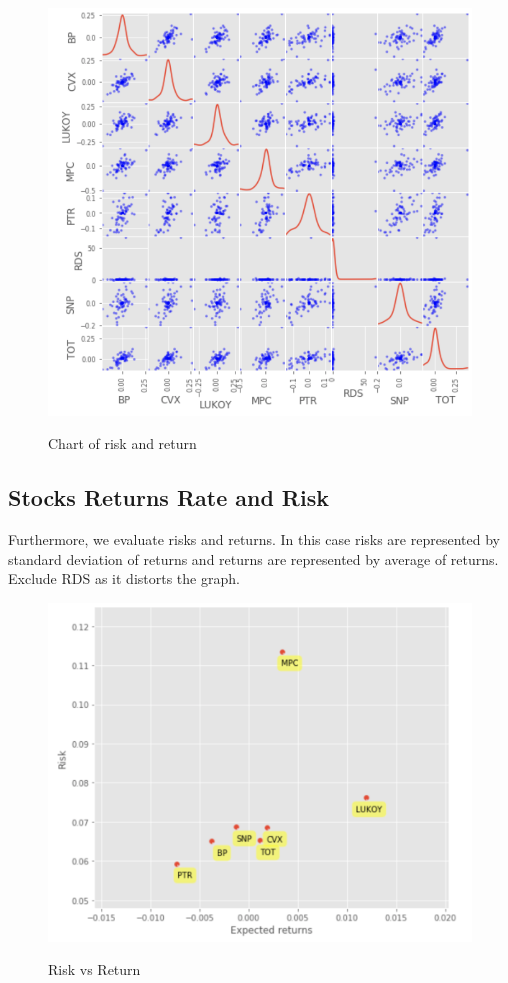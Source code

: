 \documentclass [a4paper, 11pt] {article}
\begin{document}
\begin{figure}[h]
\caption{Chart of risk and return}
\begin{center}
\includegraphics[scale=0.55]{matrix}
\label{fig:scat2}
\end{center}
\end{figure}
\clearpage

\subsection {Stocks Returns Rate and Risk}
Furthermore, we evaluate  risks and returns. In this case risks are represented by standard deviation of returns and returns are represented by average of returns.
Exclude RDS as it distorts the graph.\\

\begin{figure}[h]
\caption{Risk vs Return}
\includegraphics[scale=0.65]{return_risk}
\label{fig:scat4}
\end{figure}
\clearpage
\end{document}
